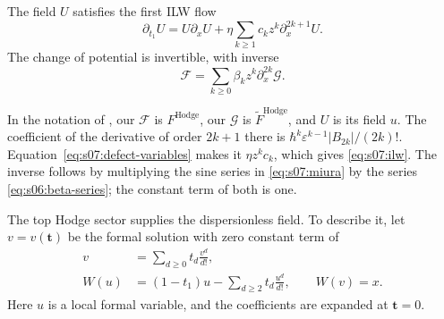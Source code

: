 \begin{thm}[Buryak]\label{thm:s07:ilw}
The field $U$ satisfies the first ILW flow
\begin{equation}\label{eq:s07:ilw}
 \partial_{t_1}U=U\partial_xU
        +\eta\sum_{k\geq1}c_k z^k\partial_x^{2k+1}U.
\end{equation}
The change of potential is invertible, with inverse
\begin{equation}\label{eq:s07:inverse-miura}
 \mathcal F=\sum_{k\geq0}\beta_k z^k\partial_x^{2k}\mathcal G.
\end{equation}
\end{thm}
\begin{prf}
In the notation of \cite[Theorem~1.1 and (1.1)--(1.2)]{Bur15}, our
$\mathcal F$ is $F^{\mathrm{Hodge}}$, our $\mathcal G$ is
$\widetilde F^{\mathrm{Hodge}}$, and $U$ is its field $u$.
The coefficient of the derivative of order $2k+1$ there is
$\hbar^k\varepsilon^{k-1}|B_{2k}|/(2k)!$.
Equation~\eqref{eq:s07:defect-variables} makes it $\eta z^k c_k$,
which gives \eqref{eq:s07:ilw}. The inverse follows by multiplying the
sine series in \eqref{eq:s07:miura} by the series
\eqref{eq:s06:beta-series}; the constant term of both is one.
\end{prf}

The top Hodge sector supplies the dispersionless field. To describe
it, let $v=v(\mathbf t)$ be the formal solution with zero constant
term of
\begin{equation}\label{eq:s07:genus-zero-inverse}
 \begin{aligned}
 v&=\sum_{d\geq0}t_d\frac{v^d}{d!},\\
 W(u)&=(1-t_1)u-\sum_{d\geq2}t_d\frac{u^d}{d!},\qquad W(v)=x.
 \end{aligned}
\end{equation}
Here $u$ is a local formal variable, and the coefficients are expanded
at $\mathbf t=0$.

